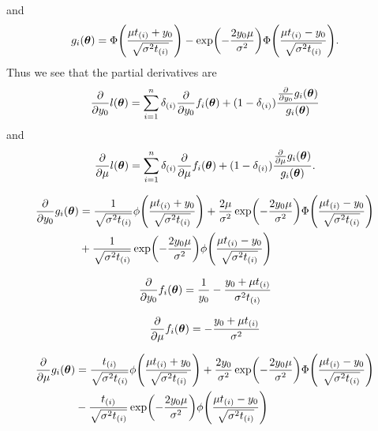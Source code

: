 and
\begin{equation}
g_i(\btheta)=\Phi\p*{\frac{\mu\ti+y_0}{\sqrt{\sigma^2\ti}}}-\exp\p*{-\frac{2y_0\mu}{\sigma^2}}\Phi\p*{\frac{\mu\ti-y_0}{\sqrt{\sigma^2\ti}}}.
\end{equation}
Thus we see that the partial derivatives are
\begin{equation}
    \frac{\partial}{\partial y_0}l(\boldsymbol{\theta})=\sum_{i=1}^n\delta_{(i)} \frac{\partial}{\partial y_0}f_i(\boldsymbol{\theta})+(1-\delta_{(i)})\frac{\frac{\partial}{\partial y_0}g_i(\boldsymbol{\theta})}{g_i(\boldsymbol{\theta})}
\end{equation}
and
\begin{equation}
    \frac{\partial}{\partial \mu}l(\boldsymbol{\theta})=\sum_{i=1}^n\delta_{(i)} \frac{\partial}{\partial \mu}f_i(\boldsymbol{\theta})+(1-\delta_{(i)})\frac{\frac{\partial}{\partial \mu}g_i(\boldsymbol{\theta})}{g_i(\boldsymbol{\theta})}.
\end{equation}

\begin{align}
\begin{split}
    \frac{\partial}{\partial y_0}g_i(\btheta)&=\frac{1}{\sqrt{\sigma^2\ti}}\phi\p*{\frac{\mu\ti+y_0}{\sqrt{\sigma^2\ti}}}+\frac{2\mu}{\sigma^2}\exp\p*{-\frac{2y_0\mu}{\sigma^2}}\Phi\p*{\frac{\mu\ti-y_0}{\sqrt{\sigma^2\ti}}} \\
    &+
    \frac{1}{\sqrt{\sigma^2\ti}}\exp\p*{-\frac{2y_0\mu}{\sigma^2}}\phi\p*{\frac{\mu\ti-y_0}{\sqrt{\sigma^2\ti}}}
\end{split}
\end{align}


\begin{equation}
    \frac{\partial}{\partial y_0}f_i(\boldsymbol{\theta})=\frac{1}{y_0}-\frac{y_0+\mu t_{(i)}}{\sigma^2t_{(i)}}
\end{equation}

\begin{equation}
    \frac{\partial}{\partial \mu}f_i(\boldsymbol{\theta})=-\frac{y_0+\mu t_{(i)}}{\sigma^2}
\end{equation}

\begin{align}
\begin{split}
    \frac{\partial}{\partial \mu}g_i(\btheta)&=\frac{\ti}{\sqrt{\sigma^2\ti}}\phi\p*{\frac{\mu\ti+y_0}{\sqrt{\sigma^2\ti}}}+\frac{2y_0}{\sigma^2}\exp\p*{-\frac{2y_0\mu}{\sigma^2}}\Phi\p*{\frac{\mu\ti-y_0}{\sqrt{\sigma^2\ti}}} \\
    &-
    \frac{\ti}{\sqrt{\sigma^2\ti}}\exp\p*{-\frac{2y_0\mu}{\sigma^2}}\phi\p*{\frac{\mu\ti-y_0}{\sqrt{\sigma^2\ti}}}
\end{split}
\end{align}